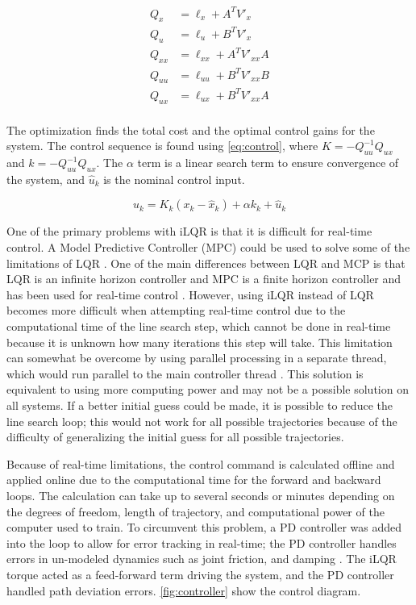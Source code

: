\begin{equation}
    \begin{split}
        Q_x &= \ell_x + A^T V'_x \\
        Q_u &= \ell_u + B^T V'_x \\
        Q_{xx} &= \ell_{xx} + A^T V'_{xx}A \\
        Q_{uu} &= \ell_{uu} + B^T V'_{xx}B \\
        Q_{ux} &= \ell_{ux} + B^T V'_{xx}A \\
    \end{split}
    \label{eq:deltaQDecomp}
\end{equation}



The optimization finds the total cost and the optimal control gains for the system. The control sequence is found using \autoref{eq:control}, where $K=-Q_{uu}^{-1}Q_{ux}$ and $k=-Q^{-1}_{uu} Q_{ux}$. The $\alpha$ term is a linear search term to ensure convergence of the system, and $\hat{u}_k$ is the nominal control input. 


\begin{equation}
    u_k = K_k (x_k - \hat{x}_k) + \alpha k_k + \hat{u}_k
    \label{eq:control}
\end{equation}

One of the primary problems with iLQR is that it is difficult for real-time control. A Model Predictive Controller (MPC) could be used to solve some of the limitations of LQR \cite{bemporad2002explicit}. One of the main differences between LQR and MCP is that LQR is an infinite horizon controller and MPC is a finite horizon controller and has been used for real-time control \cite{wang2009model}. However, using iLQR instead of LQR becomes more difficult when attempting real-time control due to the computational time of the line search step, which cannot be done in real-time because it is unknown how many iterations this step will take. This limitation can somewhat be overcome by using parallel processing in a separate thread, which would run parallel to the main controller thread \cite{MPC}. This solution is equivalent to using more computing power and may not be a possible solution on all systems. If a better initial guess could be made, it is possible to reduce the line search loop; this would not work for all possible trajectories because of the difficulty of generalizing the initial guess for all possible trajectories. 


Because of real-time limitations, the control command is calculated offline and applied online due to the computational time for the forward and backward loops. The calculation can take up to several seconds or minutes depending on the degrees of freedom, length of trajectory, and computational power of the computer used to train. To circumvent this problem, a PD controller was added into the loop to allow for error tracking in real-time; the PD controller handles errors in un-modeled dynamics such as joint friction, and damping \cite{iLQR_tassa2014}. The iLQR torque acted as a feed-forward term driving the system, and the PD controller handled path deviation errors. \autoref{fig:controller} show the control diagram. 


